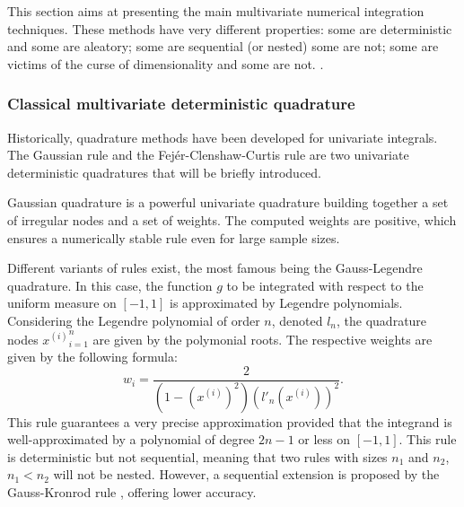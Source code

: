 This section aims at presenting the main multivariate numerical integration techniques. 
These methods have very different properties: 
some are deterministic and some are aleatory; 
some are sequential (or nested) some are not; 
some are victims of the curse of dimensionality and some are not. 
.


\subsubsection{Classical multivariate deterministic quadrature}

Historically, quadrature methods have been developed for univariate integrals. 
The Gaussian rule and the Fejér-Clenshaw-Curtis rule are two univariate deterministic quadratures that will be briefly introduced. 

Gaussian quadrature is a powerful univariate quadrature building together a set of irregular nodes and a set of weights. 
The computed weights are positive, which ensures a numerically stable rule even for large sample sizes.

Different variants of rules exist, the most famous being the Gauss-Legendre quadrature. 
In this case, the function $g$ to be integrated with respect to the uniform measure on $[-1, 1]$ is approximated by Legendre polynomials.
Considering the Legendre polynomial of order $n$, denoted $l_n$, the quadrature nodes ${x^{(i)}}_{i=1}^n$ are given by the polymonial roots.
The respective weights are given by the following formula: 
\begin{equation}
    w_{i}={\frac {2}{\left(1-\left(x^{(i)}\right)^{2}\right)\left(l'_{n}(x^{(i)})\right)^{2}}}.
\end{equation}
This rule guarantees a very precise approximation provided that the integrand is well-approximated by a polynomial of degree $2n-1$ or less on $[-1, 1]$.
This rule is deterministic but not sequential, meaning that two rules with sizes $n_1$ and $n_2$, $n_1 < n_2$ will not be nested. 
However, a sequential extension is proposed by the Gauss-Kronrod rule \citep{laurie_1997}, offering lower accuracy. 

